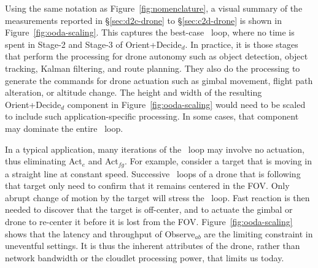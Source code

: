 Using the same notation as Figure~\ref{fig:nomenclature}, a visual
summary of the measurements reported in \S\ref{sec:d2c-drone} to
\S\ref{sec:c2d-drone} is shown in Figure~\ref{fig:ooda-scaling}.  This
captures the best-case \ooda~loop, where no time is spent in Stage-2
and Stage-3 of Orient+Decide$_d$.  In practice, it is those stages that
perform the processing for drone autonomy such as object detection,
object tracking, Kalman filtering, and route planning.  They also do
the processing to generate the commands for drone actuation such as
gimbal movement, flight path alteration, or altitude change.  The
height and width of the resulting Orient+Decide$_d$ component in
Figure~\ref{fig:ooda-scaling} would need to be scaled to include such
application-specific processing.  In some cases, that component
may dominate the entire \ooda~loop.

In a typical application, many iterations of the \ooda~loop may
involve no actuation, thus eliminating Act$_{e}$ and Act$_{fg}$.  For
example, consider a target that is moving in a straight line at
constant speed.  Successive \ooda~loops of a drone that is following
that target only need to confirm that it remains centered in the FOV.
Only abrupt change of motion by the target will stress the \ooda~loop.
Fast reaction is then needed to discover that the target is
off-center, and to actuate the gimbal or drone to re-center it before
it is lost from the FOV.  Figure~\ref{fig:ooda-scaling} shows that the
latency and throughput of Observe$_{ab}$ are the limiting constraint
in uneventful settings.  It is thus the inherent attributes
of the drone, rather than network bandwidth or the cloudlet processing
power, that limits us today.

